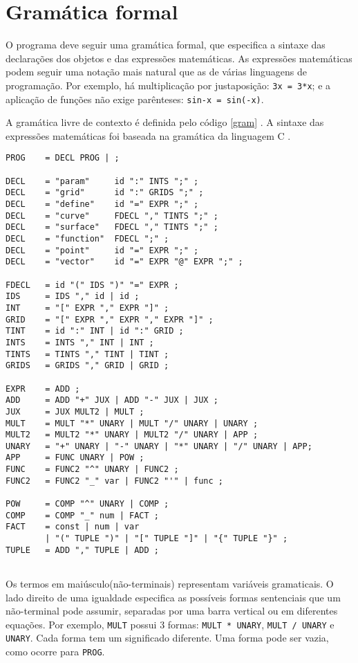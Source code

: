 \section{Gramática formal}
O programa deve seguir uma gramática formal, 
que especifica a sintaxe das declarações dos objetos e das expressões matemáticas.
As expressões matemáticas podem seguir uma notação mais natural
que as de várias linguagens de programação.
Por exemplo, há multiplicação por justaposição: \texttt{3x = 3*x};
e a aplicação de funções não exige parênteses: \texttt{sin-x = sin(-x)}.

A gramática livre de contexto é definida pelo código \ref{gram} \cite{Dragon:1}.
A sintaxe das expressões matemáticas foi baseada na gramática da linguagem C \cite{CGram}.

\newpage
\begin{lstlisting}[caption=Gramática livre de contexto,label=gram]
PROG    = DECL PROG | ;

DECL    = "param"     id ":" INTS ";" ;
DECL    = "grid"      id ":" GRIDS ";" ;
DECL    = "define"    id "=" EXPR ";" ;
DECL    = "curve"     FDECL "," TINTS ";" ;
DECL    = "surface"   FDECL "," TINTS ";" ;
DECL    = "function"  FDECL ";" ;
DECL    = "point"     id "=" EXPR ";" ;
DECL    = "vector"    id "=" EXPR "@" EXPR ";" ;

FDECL   = id "(" IDS ")" "=" EXPR ;
IDS     = IDS "," id | id ;
INT     = "[" EXPR "," EXPR "]" ;
GRID    = "[" EXPR "," EXPR "," EXPR "]" ;
TINT    = id ":" INT | id ":" GRID ;
INTS    = INTS "," INT | INT ;
TINTS   = TINTS "," TINT | TINT ;
GRIDS   = GRIDS "," GRID | GRID ;

EXPR    = ADD ;
ADD     = ADD "+" JUX | ADD "-" JUX | JUX ;
JUX     = JUX MULT2 | MULT ;
MULT    = MULT "*" UNARY | MULT "/" UNARY | UNARY ;
MULT2   = MULT2 "*" UNARY | MULT2 "/" UNARY | APP ;
UNARY   = "+" UNARY | "-" UNARY | "*" UNARY | "/" UNARY | APP;
APP     = FUNC UNARY | POW ;
FUNC    = FUNC2 "^" UNARY | FUNC2 ;
FUNC2   = FUNC2 "_" var | FUNC2 "'" | func ;

POW     = COMP "^" UNARY | COMP ;
COMP    = COMP "_" num | FACT ;
FACT    = const | num | var
        | "(" TUPLE ")" | "[" TUPLE "]" | "{" TUPLE "}" ;
TUPLE   = ADD "," TUPLE | ADD ;
    
\end{lstlisting}

Os termos em maiúsculo(não-terminais) representam variáveis gramaticais.
O lado direito de uma igualdade especifica as possíveis formas sentenciais
que um não-terminal pode assumir, 
separadas por uma barra vertical ou em diferentes equações.
Por exemplo, \texttt{MULT} possui 3 formas:
\texttt{MULT * UNARY}, \texttt{MULT / UNARY} e \texttt{UNARY}.
Cada forma tem um significado diferente.
Uma forma pode ser vazia, como ocorre para \texttt{PROG}.

